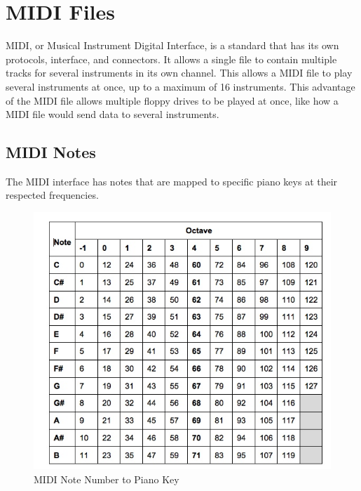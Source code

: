 \documentclass[11pt, a4paper]{report}
\begin{document}
\chapter{MIDI Files}

MIDI, or Musical Instrument Digital Interface, is a standard that has its own protocols, interface, and connectors. It allows a single file to contain multiple tracks for several instruments in its own channel. This allows a MIDI file to play several instruments at once, up to a maximum of 16 instruments. This advantage of the MIDI file allows multiple floppy drives to be played at once, like how a MIDI file would send data to several instruments. 

\section{MIDI Notes}

The MIDI interface has notes that are mapped to specific piano keys at their respected frequencies. 
\begin{figure}[H]
\hspace*{-2cm}    
    \centering
    \includegraphics[width=.75\textwidth]{midi_notechart.jpg}
    \caption{MIDI Note Number to Piano Key}
\end{figure}
\end{document}
